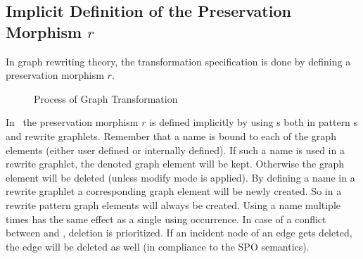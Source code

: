 \subsection{Implicit Definition of the Preservation Morphism $r$}
\label{rule:morphismr}
In graph rewriting theory, the transformation specification is done by defining a preservation morphism $r$.
\begin{figure}[htbp]
	\centering
  \caption{Process of Graph Transformation}
  \label{rule:figrule}
\end{figure}
In \GrG\, the preservation morphism $r$ is defined implicitly by using s both in pattern s and rewrite graphlets.
Remember that a name is bound to each of the graph elements (either user defined or internally defined).
If such a name is used in a rewrite graphlet, the denoted graph element will be kept.
Otherwise the graph element will be deleted (unless modify mode is applied).
By defining a name in a rewrite graphlet a corresponding graph element will be newly created.
So in a rewrite pattern  graph elements will always be created.
Using a name multiple times has the same effect as a single using occurrence.
In case of a conflict between  and , deletion is prioritized.
If an incident node of an edge gets deleted, the edge will be deleted as well (in compliance to the SPO semantics).

